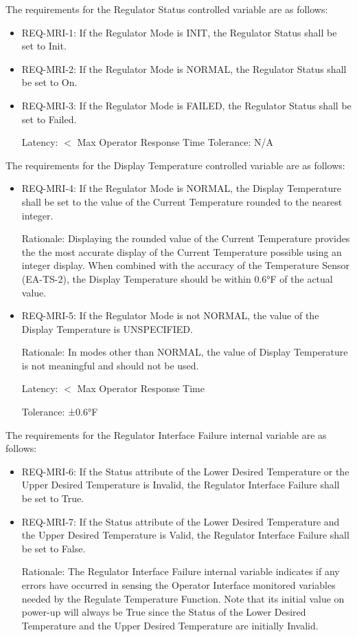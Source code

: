 The requirements for the Regulator Status controlled variable are as follows:

\begin{itemize}
\item REQ-MRI-1: If the Regulator Mode is INIT, the Regulator Status shall be set to Init.
\item REQ-MRI-2: If the Regulator Mode is NORMAL, the Regulator Status shall be set to On.
\item REQ-MRI-3: If the Regulator Mode is FAILED, the Regulator Status shall be set to Failed.

      Latency: $<$ Max Operator Response Time
      Tolerance: N/A
\end{itemize}

The requirements for the Display Temperature controlled variable are as follows:

\begin{itemize}
\item REQ-MRI-4: If the Regulator Mode is NORMAL, the Display Temperature shall be set
      to the value of the Current Temperature rounded to the nearest integer.

      Rationale: Displaying the rounded value of the Current Temperature provides the the
      most accurate display of the Current Temperature possible using an integer display.
      When combined with the accuracy of the Temperature Sensor (EA-TS-2), the Display
      Temperature should be within 0.6°F of the actual value.
\item REQ-MRI-5: If the Regulator Mode is not NORMAL, the value of the Display Temperature is UNSPECIFIED.

      Rationale: In modes other than NORMAL, the value of Display Temperature is not
      meaningful and should not be used.

      Latency: $<$ Max Operator Response Time

      Tolerance: ±0.6°F
\end{itemize}

The requirements for the Regulator Interface Failure internal variable are as follows:

\begin{itemize}
\item REQ-MRI-6: If the Status attribute of the Lower Desired Temperature or the Upper
      Desired Temperature is Invalid, the Regulator Interface Failure shall be set to True.
\item REQ-MRI-7: If the Status attribute of the Lower Desired Temperature and the Upper
      Desired Temperature is Valid, the Regulator Interface Failure shall be set to False.

      Rationale: The Regulator Interface Failure internal variable indicates if any errors have
      occurred in sensing the Operator Interface monitored variables needed by the Regulate
      Temperature Function. Note that its initial value on power-up will always be True since
      the Status of the Lower Desired Temperature and the Upper Desired Temperature are
      initially Invalid.
\end{itemize}

